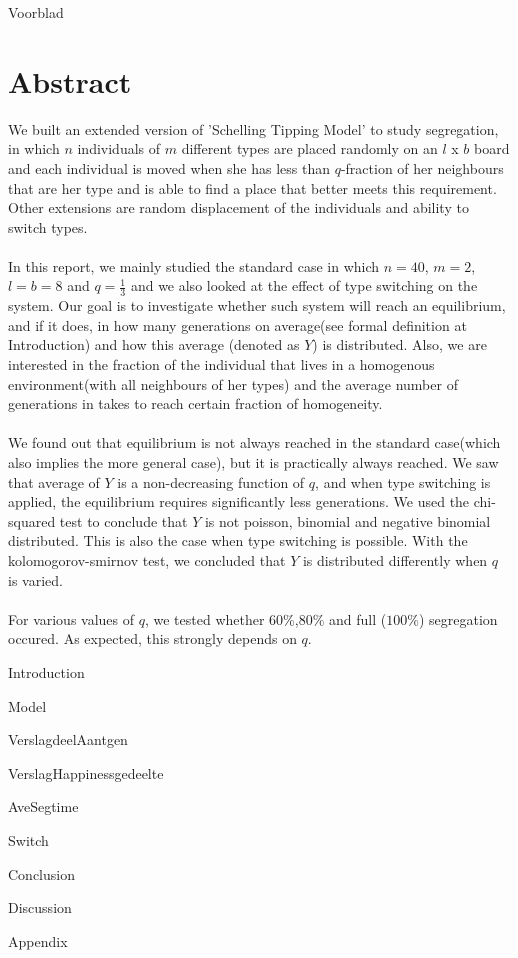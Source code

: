 \documentclass{article}
\begin{document}
{Voorblad}
\newpage


\section*{Abstract}
We built an extended version of 'Schelling Tipping Model' to study segregation, in which $n$ individuals of $m$ different types are placed randomly on an $l$ x $b$ board and each individual is moved when she has less than $q$-fraction of her neighbours that are her type and is able to find a place that better meets this requirement. Other extensions are random displacement of the individuals and ability to switch types.\\
\\
In this report, we mainly studied the standard case in which $n=40$, $m=2$, $l=b=8$ and $q=\frac{1}{3}$ and we also looked at the effect of type switching on the system. Our goal is to investigate whether such system will reach an equilibrium, and if it does, in how many generations on average(see formal definition at Introduction) and how this average (denoted as $Y$) is distributed. Also, we are interested in the fraction of the individual that lives in a homogenous environment(with all neighbours of her types) and the average number of generations in takes to reach certain fraction of homogeneity.\\
\\
We found out that equilibrium is not always reached in the standard case(which also implies the more general case), but it is practically always reached. We saw that average of $Y$ is a non-decreasing function of $q$, and when type switching is applied, the equilibrium requires significantly less generations. We used the chi-squared test to conclude that $Y$ is not poisson, binomial and negative binomial distributed. This is also the case when type switching is possible. With the kolomogorov-smirnov test, we concluded that $Y$ is distributed differently when $q$ is varied.\\
\\
For various values of $q$, we tested whether $60\%$,$80\%$ and full ($100\%$) segregation occured. As expected, this strongly depends on $q$.

\newpage

\tableofcontents
\newpage

{Introduction}
\newpage

{Model}
\newpage


\newpage

{VerslagdeelAantgen}
\newpage

{VerslagHappinessgedeelte}
\newpage

{AveSegtime}
\newpage

{Switch}
\newpage

{Conclusion}
\newpage

{Discussion}
\newpage

{Appendix}
\end{document}
